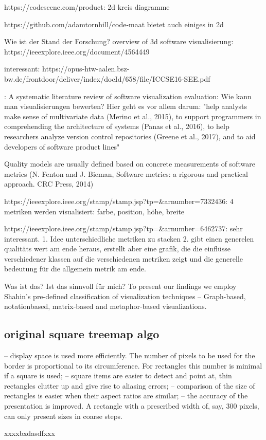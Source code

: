 https://codescene.com/product:
2d kreis diagramme

https://github.com/adamtornhill/code-maat
bietet auch einiges in 2d

Wie ist der Stand der Forschung?
overview of 3d software visualisierung: https://ieeexplore.ieee.org/document/4564449

interessant: https://opus-htw-aalen.bsz-bw.de/frontdoor/deliver/index/docId/658/file/ICCSE16-SEE.pdf

\cite{MERINO2018165}:
A systematic literature review of software visualization evaluation:
Wie kann man visualisierungen bewerten?
Hier geht es vor allem darum: "help analysts make sense of multivariate data
(Merino et al., 2015), to support programmers in comprehending the
architecture of systems (Panas et al., 2016), to help researchers analyze
version control repositories (Greene et al., 2017), and to aid developers
of software product lines"


Quality models are usually defined based on concrete measurements of software metrics (N. Fenton and J. Bieman, Software metrics: a rigorous and practical approach. CRC Press, 2014)

https://ieeexplore.ieee.org/stamp/stamp.jsp?tp=&arnumber=7332436:
4 metriken werden visualisiert: farbe, position, höhe, breite

https://ieeexplore.ieee.org/stamp/stamp.jsp?tp=&arnumber=6462737:
sehr interessant.
1. Idee unterschiedliche metriken zu stacken
2. gibt einen generelen qualitäts wert am ende heraus, erstellt aber eine grafik, die die einflüsse verschiedener klassen auf die verschiedenen metriken zeigt und die generelle bedeutung für die allgemein metrik am ende.


Was ist das? Ist das sinnvoll für mich?
To present our findings
we employ Shahin’s pre-defined classification of
visualization techniques – Graph-based, notationbased, matrix-based and metaphor-based
visualizations. 

\subsection{original square treemap algo}
– display space is used more efficiently. The number of pixels to be used for the border
is proportional to its circumference. For rectangles this number is minimal if a square
is used;
– square items are easier to detect and point at, thin rectangles clutter up and give rise
to aliasing errors;
– comparison of the size of rectangles is easier when their aspect ratios are similar;
– the accuracy of the presentation is improved. A rectangle with a prescribed width of,
say, 300 pixels, can only present sizes in coarse steps.

xxxxbxdasdfxxx


